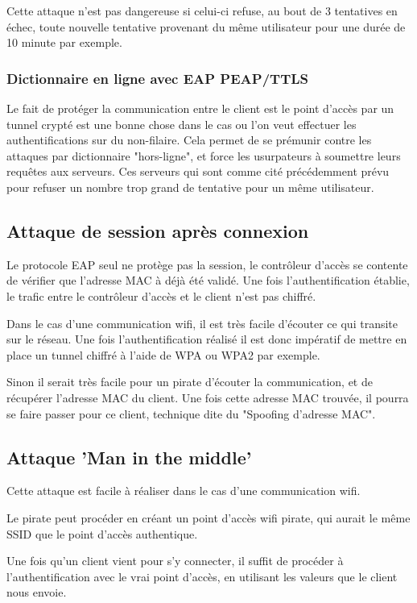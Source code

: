 Cette attaque n'est pas dangereuse si celui-ci refuse, au bout de 3 tentatives en échec, toute nouvelle tentative provenant du même utilisateur pour une durée de 10 minute par exemple. 

\subsubsection{Dictionnaire en ligne avec EAP PEAP/TTLS}

Le fait de protéger la communication entre le client est le point d'accès par un tunnel crypté est une bonne chose dans le cas ou l'on veut effectuer les authentifications sur du non-filaire.
Cela permet de se prémunir contre les attaques par dictionnaire "hors-ligne", et force les usurpateurs à soumettre leurs requêtes aux serveurs. 
Ces serveurs qui sont comme cité précédemment prévu pour refuser un nombre trop grand de tentative pour un même utilisateur. 

\subsection{Attaque de session après connexion}

Le protocole EAP seul ne protège pas la session, le contrôleur d’accès se contente de vérifier que l’adresse MAC à déjà été validé. Une fois l’authentification établie, le trafic entre le contrôleur d'accès et le client n’est pas chiffré. 

Dans le cas d’une communication wifi, il est très facile d'écouter ce qui transite sur le réseau. Une fois l'authentification réalisé il est donc impératif de mettre en place un tunnel chiffré à l’aide de WPA ou WPA2 par exemple. 

Sinon il serait très facile pour un pirate d'écouter la communication, et de récupérer l'adresse MAC du client. Une fois cette adresse MAC trouvée, il pourra se faire passer pour ce client, technique dite du "Spoofing d'adresse MAC". 

\subsection{Attaque 'Man in the middle'}

Cette attaque est facile à réaliser dans le cas d’une communication wifi. 

Le pirate peut procéder en créant un point d'accès wifi pirate, qui aurait le même SSID que le point d'accès authentique. 

Une fois qu'un client vient pour s'y connecter, il suffit de procéder à l'authentification avec le vrai point d'accès, en utilisant les valeurs que le client nous envoie. 

